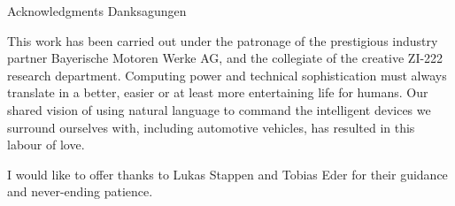 \newpage

\makeatletter
{}
{}
{}
\makeatother
\thispagestyle{empty}

\vspace*{20mm}

\begin{center}
\makeatletter
{}
{ Acknowledgments}
{ Danksagungen}
\makeatother
\end{center}

\vspace{10mm}

This work has been carried out under the patronage of the prestigious industry partner Bayerische Motoren Werke AG, and the collegiate of the creative ZI-222 research department. Computing power and technical sophistication must always translate in a better, easier or at least more entertaining life for humans. Our shared vision of using natural language to command the intelligent devices we surround ourselves with, including automotive vehicles, has resulted in this labour of love.

I would like to offer thanks to Lukas Stappen and Tobias Eder for their guidance and never-ending patience.


\cleardoublepage{}
